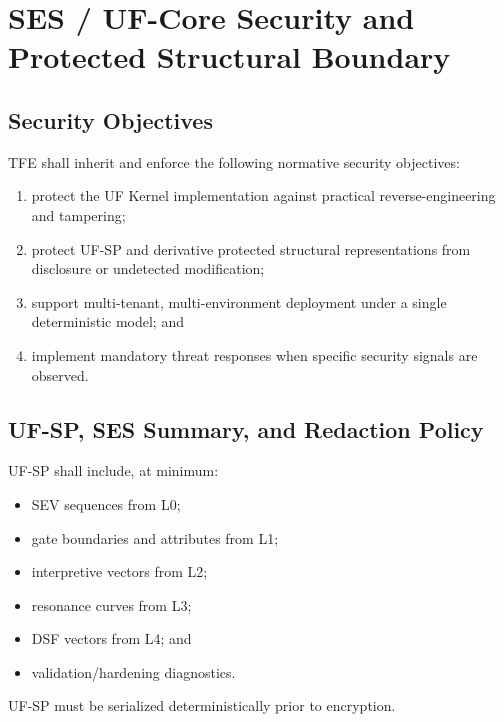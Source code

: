\chapter{SES / UF-Core Security and Protected Structural Boundary}
\section{Security Objectives}

TFE shall inherit and enforce the following normative security objectives:
\begin{enumerate}[leftmargin=1.2cm]
    \item protect the UF Kernel implementation against practical reverse-engineering and tampering;
    \item protect UF-SP and derivative protected structural representations from disclosure or undetected modification;
    \item support multi-tenant, multi-environment deployment under a single deterministic model; and
    \item implement mandatory threat responses when specific security signals are observed.
\end{enumerate}

\section{UF-SP, SES Summary, and Redaction Policy}

UF-SP shall include, at minimum:
\begin{itemize}
    \item SEV sequences from L0;
    \item gate boundaries and attributes from L1;
    \item interpretive vectors from L2;
    \item resonance curves from L3;
    \item DSF vectors from L4; and
    \item validation/hardening diagnostics.
\end{itemize}

UF-SP must be serialized deterministically prior to encryption.


